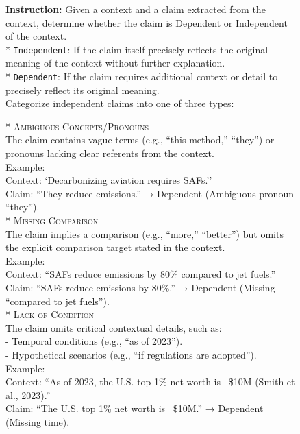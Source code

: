 \documentclass{article}
\begin{document}
\clearpage


\begin{figure}[t]
\begin{small}
\centering
\begin{tcolorbox}[
    colback=gray!5,
    colframe=black,
    width=\linewidth,
    arc=2mm,
    boxrule=0.5pt,
    title=\textbf{Atomic Fact Generation (Step 3): Incomplete Fact Rewriting Prompt}
]
\textbf{Instruction:} Given a context and a claim extracted from the context, determine whether the claim is Dependent or Independent of the context.\\
* \texttt{Independent}: If the claim itself precisely reflects the original meaning of the context without further explanation. \\
* \texttt{Dependent}: If the claim requires additional context or detail to precisely reflect its original meaning.\\

Categorize independent claims into one of three types:

* \textsc{Ambiguous Concepts/Pronouns}\\
    The claim contains vague terms (e.g., ``this method,'' ``they'') or pronouns lacking clear referents from the context.\\
    Example:\\
    Context: `Decarbonizing aviation requires SAFs.''\\
    Claim: ``They reduce emissions.'' → Dependent (Ambiguous pronoun ``they'').\\
* \textsc{Missing Comparison}\\
    The claim implies a comparison (e.g., ``more,'' ``better'') but omits the explicit comparison target stated in the context.\\
    Example:\\
    Context: ``SAFs reduce emissions by 80\% compared to jet fuels.''\\
    Claim: ``SAFs reduce emissions by 80\%.'' → Dependent (Missing ``compared to jet fuels'').\\
* \textsc{Lack of Condition}\\
    The claim omits critical contextual details, such as:\\
    - Temporal conditions (e.g., ``as of 2023'').\\
    - Hypothetical scenarios (e.g., ``if regulations are adopted'').\\
    Example:\\
    Context: ``As of 2023, the U.S. top 1\% net worth is ~\$10M (Smith et al., 2023).''\\
    Claim: ``The U.S. top 1\% net worth is ~\$10M.'' → Dependent (Missing time).\\


\end{tcolorbox}
\end{small}
\end{figure}
\end{document}

